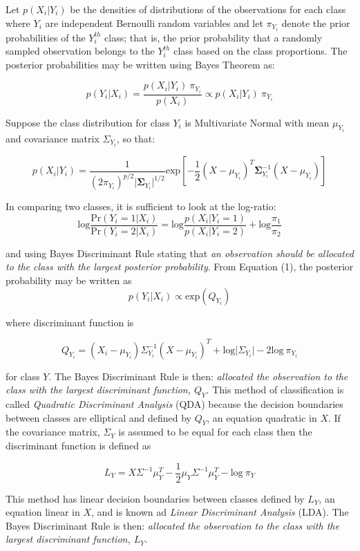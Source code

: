 \documentclass[12pt,]{article}
\begin{document}
Let \(p(X_i \vert Y_i)\) be the densities of distributions of the
observations for each class where \(Y_i\) are independent Bernoulli
random variables and let \(\pi_{Y_i}\) denote the prior probabilities of
the \(Y^{th}_i\) class; that is, the prior probability that a randomly
sampled observation belongs to the \(Y_i^{th}\) class based on the class
proportions. The posterior probabilities may be written using Bayes
Theorem as:

\[
p(Y_i \vert X_i) = \frac{p(X_i \vert Y_i) ~\pi_{Y_i}}{p(X_i)} \propto p(X_i \vert Y_i) ~\pi_{Y_i}   \tag{3}
\]

Suppose the class distribution for class \(Y_i\) is Multivariate Normal
with mean \(\mu_{Y_i}\) and covariance matrix \(\Sigma_{Y_i}\), so that:

\[
p(X_i \vert Y_i) = \frac{1}{(2 \pi_{Y_i})^{p/2} \vert\boldsymbol{\Sigma}_{Y_i} \vert ^{1/2}} \text{exp} \left[-\frac{1}{2}(X - \mu_{Y_i})^T \boldsymbol{\Sigma}^{-1}_{Y_i}(X - \mu_{Y_i})  \right]  \tag{4}
\]

In comparing two classes, it is sufficient to look at the log-ratio: \[
\text{log} \frac{\text{Pr}(Y_i=1 \vert X_i)}{\text{Pr}(Y_i=2 \vert X_i)} = \text{log}\frac{p(X_i \vert Y_i=1)}{p(X_i \vert Y_i=2)} + \text{log}\frac{\pi_1}{\pi_2}   \tag{5}
\]

and using Bayes Discriminant Rule stating that \emph{an observation
should be allocated to the class with the largest posterior
probability}. From Equation (1), the posterior probability may be
written as \[
p(Y_i \vert X_i) \propto \text{exp} \left( Q_{Y_i} \right)    \tag{6}
\]

where discriminant function is

\[
Q_{Y_i} = (X_i - \mu_{Y_i}) \Sigma^{-1}_{Y_i} (X - \mu_{Y_i})^T + \text{log} \vert \Sigma_{Y_i} \vert - 2\text{log} ~\pi_{Y_i}   \tag{7}
\]

for class \(Y\). The Bayes Discriminant Rule is then: \emph{allocated
the observation to the class with the largest discriminant function,
\(Q_Y\)}. This method of classification is called \emph{Quadratic
Discriminant Analysis} (QDA) because the decision boundaries between
classes are elliptical and defined by \(Q_Y\), an equation quadratic in
\(X\). If the covariance matrix, \(\Sigma_Y\) is assumed to be equal for
each class then the discriminant function is defined as

\[
L_Y = X \Sigma^{-1} \mu_Y^T -\frac{1}{2}\mu_Y \Sigma^{-1} \mu_Y^T  - \text{log} ~\pi_Y     \tag{8}
\]

This method has linear decision boundaries between classes defined by
\(L_Y\), an equation linear in \(X\), and is known ad \emph{Linear
Discriminant Analysis} (LDA). The Bayes Discriminant Rule is then:
\emph{allocated the observation to the class with the largest
discriminant function, \(L_Y\)}.
\end{document}
